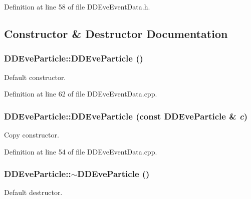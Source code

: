 Definition at line 58 of file DDEveEventData.h.

\subsection{Constructor \& Destructor Documentation}
\hypertarget{class_d_d4hep_1_1_d_d_eve_particle_a8ef98497c0ce8ee341913e031ffaf265}{
\subsubsection[{DDEveParticle}]{\setlength{\rightskip}{0pt plus 5cm}DDEveParticle::DDEveParticle ()}}
\label{class_d_d4hep_1_1_d_d_eve_particle_a8ef98497c0ce8ee341913e031ffaf265}


Default constructor. 

Definition at line 62 of file DDEveEventData.cpp.\hypertarget{class_d_d4hep_1_1_d_d_eve_particle_a3c869edc6c878c86cc596f7f435c87f4}{
\subsubsection[{DDEveParticle}]{\setlength{\rightskip}{0pt plus 5cm}DDEveParticle::DDEveParticle (const {\bf DDEveParticle} \& {\em c})}}
\label{class_d_d4hep_1_1_d_d_eve_particle_a3c869edc6c878c86cc596f7f435c87f4}


Copy constructor. 

Definition at line 54 of file DDEveEventData.cpp.\hypertarget{class_d_d4hep_1_1_d_d_eve_particle_ac09bab207cb97dc1348aceb043319123}{
\subsubsection[{$\sim$DDEveParticle}]{\setlength{\rightskip}{0pt plus 5cm}DDEveParticle::$\sim$DDEveParticle ()}}
\label{class_d_d4hep_1_1_d_d_eve_particle_ac09bab207cb97dc1348aceb043319123}


Default destructor. 

